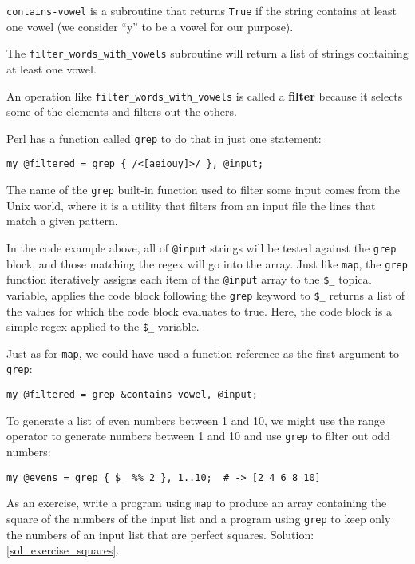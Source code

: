 {\tt contains-vowel} is a subroutine that returns 
{\tt True} if the string contains at least one vowel 
(we consider ``y'' to be a vowel for our purpose).

The \verb"filter_words_with_vowels" subroutine will return 
a list of strings containing at least one vowel.

An operation like \verb"filter_words_with_vowels" is called 
a {\bf filter} because it selects some of the elements and 
filters out the others.

Perl has a function called {\tt grep} to do that in just 
one statement:

\begin{verbatim}
my @filtered = grep { /<[aeiouy]>/ }, @input;
\end{verbatim}
%

The name of the {\tt grep} built-in function used to 
filter some input comes from the Unix world, where it 
is a utility that filters from an input file the lines that 
match a given pattern.

In the code example above, all of \verb'@input' strings 
will be tested against the 
{\tt grep} block, and those matching the regex will go into the 
{\tt \@filtered} array. Just like {\tt map}, the {\tt grep} 
function iteratively assigns each item of the \verb"@input" 
array to the \verb'$_' topical variable, applies the 
code block following the {\tt grep} keyword to \verb'$_'  
returns a list of the values for which the code block 
evaluates to true. Here, the code block is a simple regex 
applied to the \verb'$_' variable.

Just as for {\tt map}, we could have used a function 
reference as the first argument to  {\tt grep}:

\begin{verbatim}
my @filtered = grep &contains-vowel, @input;
\end{verbatim}
%

To generate a list of even numbers between 1 and 10, we might 
use the range operator to generate numbers between 1 and 10 
and use {\tt grep} to filter out odd numbers:

\begin{verbatim}
my @evens = grep { $_ %% 2 }, 1..10;  # -> [2 4 6 8 10]
\end{verbatim}
%

\label{exercise_squares}
As an exercise, write a program using {\tt map} to 
produce an array containing the square of the numbers 
of the input list and a program using {\tt grep} to keep 
only the numbers of an input list that are perfect squares. Solution: \ref{sol_exercise_squares}.

